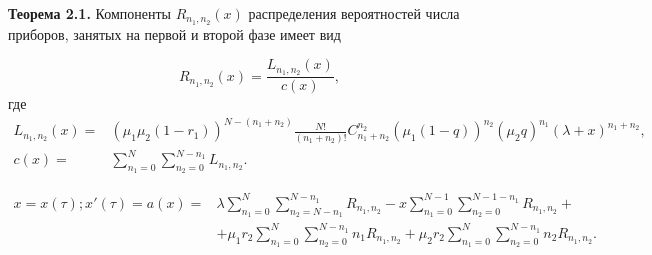 \textbf{Теорема 2.1.} Компоненты  $R_{n_{1}, n_{2}}(x)$ распределения вероятностей числа приборов, занятых на первой и второй фазе имеет вид

\begin{equation}\label{R}
		R_{n_{1}, n_{2}}(x)=\frac{L_{n_{1}, n_{2}}(x)}{c(x)},
\end{equation}
		где\\
\begin{equation*}
	\begin{aligned}
		L_{n_{1}, n_{2}}(x) =& (\mu_{1}\mu_{2}(1-r_{1}))^{N-(n_{1}+n_{2})}
		\frac{N!}{(n_{1}+n_{2})!}C_{n_{1}+n_{2}}^{n_{2}}
		(\mu_{1}(1-q))^{n_{2}}(\mu_{2}q)^{n_{1}}(\lambda+x)^{n_{1}+n_{2}},\\
		c(x)=&\sum_{n_1=0}^N\sum_{n_2=0}^{N-n_1} L_{n_{1}, n_{2}}.
	\end{aligned}
\end{equation*}

\begin{equation*}
	\begin{aligned}
		x=x(\tau);x'(\tau)=a(x)=&\lambda \sum_{n_1=0}^N\sum_{n_2=N-n_1}^{N-n_1} 
		R_{n_{1}, n_{2}}
		- x\sum_{n_1=0}^{N-1}\sum_{n_2=0}^{N-1-n_1} 
		R_{n_{1}, n_{2}}+\\
		&+\mu_1 r_2 \sum_{n_1=0}^{N}\sum_{n_2=0}^{N-n_1} 
		n_1 R_{n_{1}, n_{2}}
		+\mu_2 r_2 \sum_{n_1=0}^{N}\sum_{n_2=0}^{N-n_1} 
		n_2 R_{n_{1}, n_{2}}.
	\end{aligned}
\end{equation*}